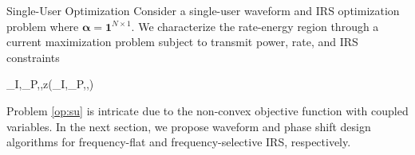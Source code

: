 \documentclass{IEEEtran}
\begin{document}
\begin{section}{Single-User Optimization}
	Consider a single-user waveform and IRS optimization problem where $\boldsymbol{\alpha}=\boldsymbol{1}^{N \times 1}$. We characterize the rate-energy region through a current maximization problem subject to transmit power, rate, and IRS constraints
	\begin{maxi!}
			{\boldsymbol{w}_I,_P,\boldsymbol{\phi},\rho}{z(\boldsymbol{w}_I,_P,\boldsymbol{\phi},\rho)}{\label{op:su}}{}
		\end{maxi!}
	Problem \ref{op:su} is intricate due to the non-convex objective function with coupled variables. In the next section, we propose waveform and phase shift design algorithms for frequency-flat and frequency-selective IRS, respectively.


\end{section}
\end{document}
